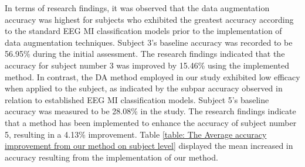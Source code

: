 \documentclass[runningheads]{llncs}
\begin{document}
In terms of research findings, it was observed that the data augmentation accuracy was highest for subjects who exhibited the greatest accuracy according to the standard EEG MI classification models prior to the implementation of data augmentation techniques. Subject 3's baseline accuracy was recorded to be 56.95\% during the initial assessment. The research findings indicated that the accuracy for subject number 3 was improved by 15.46\% using the implemented method. In contrast, the DA method employed in our study exhibited low efficacy when applied to the subject, as indicated by the subpar accuracy observed in relation to established EEG MI classification models. 
Subject 5's baseline accuracy was measured to be 28.08\% in the study. The research findings indicate that a method has been implemented to enhance the accuracy of subject number 5, resulting in a 4.13\% improvement. Table \ref{table: The Average accuracy improvement from our method on subject level} displayed the mean increased in accuracy resulting from the implementation of our method.
 

\begin{table}[ht] 
\centering
\caption{\label{table: The Average accuracy improvement from our method on subject level} The Average accuracy improvement from our method on subject level}
\end{table}
\end{document}
